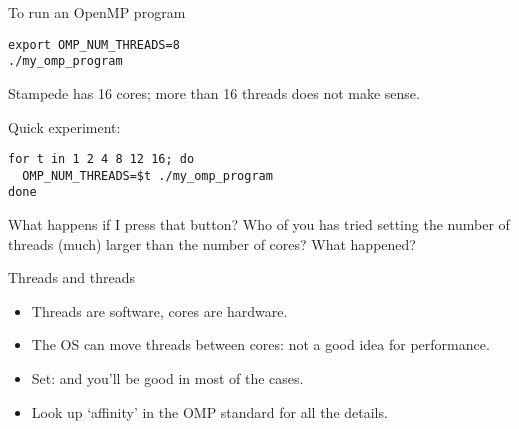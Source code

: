 \begin{frame}[containsverbatim]{To run an OpenMP program}
\begin{verbatim}
export OMP_NUM_THREADS=8
./my_omp_program
\end{verbatim}

\begin{tacc}
  Stampede has 16 cores; more than 16 threads does not make sense.
\end{tacc}

Quick experiment:
\begin{verbatim}
for t in 1 2 4 8 12 16; do
  OMP_NUM_THREADS=$t ./my_omp_program
done
\end{verbatim}
\end{frame}

\begin{exerciseframe}[parallel]
  
\end{exerciseframe}

\begin{frame}{What happens if I press that button?}
  Who of you has tried setting the number of threads (much) larger
  than the number of cores? What happened?
\end{frame}

\begin{frame}[containsverbatim]{Threads and threads}
  \begin{itemize}    
  \item Threads are software, cores are hardware.
  \item The OS can move threads between cores: not a good idea for
    performance.
  \item Set:  and you'll be good in
    most of the cases.
  \item Look up `affinity' in the OMP standard for all the details.
  \end{itemize}
\end{frame}

\begin{exerciseframe}
  
\end{exerciseframe}

